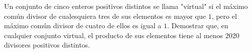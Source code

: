 Un conjunto de cinco enteros positivos distintos se llama "virtual" si el máximo común divisor de cualesquiera tres de sus elementos es mayor que $1$, pero el máximo común divisor de cuatro de ellos es igual a $1$. Demostrar que, en cualquier conjunto virtual, el producto de sus elementos tiene al menos $2020$ divisores positivos distintos.
